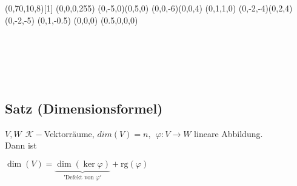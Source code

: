 \documentclass[a4paper, 12pt,titlepage, pdf, headsepline]{article}
\newcommand{\R}{\mathds{R}}
\newcommand{\K}{\mathcal{K}}
\newcommand{\rg}{\textrm{rg}}
\renewcommand{\>}{\rightarrow}
\renewcommand{\*}{\cdot}
\renewcommand{\phi}{\varphi}
\begin{document}
		      			\begin{minipage}[c]{0.425\textwidth}
		      				\Viewpoint(0,70,10,8)[1]
		      				\SetCMYKColor(0,0,0,255)
		      				\SetNormal
		      				\DDArrowAt(0,-5,0)(0,5,0)
		      				\DDArrowAt(0,0,-6)(0,0,4)
		      				\Text[r]{$y~~~~~~~~~~~~~~~~~~~~~\R^2$}
		      				\SetCMYKColor(0,1,1,0)
		      				\DDArrowAt(0,-2,-4)(0,2,4)
		      				\Text[b]{$\phi(\R^3)$}
		      				\DDMoveTo(0,-2,-5)
		      				\Text[c]{$\phi(\langle v\rangle)$}
		      				\DDMoveTo(0,1,-0.5)
		      				\Text[c]{$\ker\phi$}
		      				\DDMoveTo(0,0,0)
		      				\SetCMYKColor(0.5,0,0,0)
		      				\BigPoint
		      				\CloseGraph
		      			\end{minipage}\\
		      			\\
		      			\\
		      			\\
		      			\subsection{Satz (Dimensionsformel)}
		      			\label{6.14}
		      			$V,W ~~\K-$Vektorräume, $dim(V) = n,~~ \phi: V \rightarrow W$ lineare Abbildung.\\
		      			Dann ist 
		      			\begin{center}
		      				$\dim(V)= \underbrace{\dim(\ker\phi)}_{\text{'Defekt von }\phi'} + \rg(\phi)$
		      			\end{center}
\end{document}
